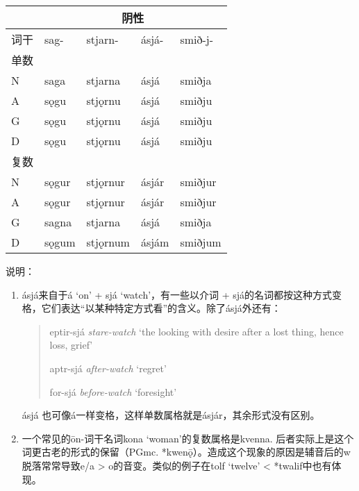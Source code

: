 \begin{longtable}{lllll}
  \toprule
       & \multicolumn{4}{c}{\textbf{阴性}}                              \\
  \midrule
  \endhead
  \bottomrule
  \endfoot
  词干 & sag-                     & stjarn-  & ásjá- & smið-j- \\
  单数 &                          &          &       &         \\
  N    & saga                     & stjarna  & ásjá  & smiðja  \\
  A    & sǫgu                     & stjǫrnu  & ásjá  & smiðju  \\
  G    & sǫgu                     & stjǫrnu  & ásjá  & smiðju  \\
  D    & sǫgu                     & stjǫrnu  & ásjá  & smiðju  \\
  复数 &                          &          &       &         \\
  N    & sǫgur                    & stjǫrnur & ásjár & smiðjur \\
  A    & sǫgur                    & stjǫrnur & ásjár & smiðjur \\
  G    & sagna                    & stjarna  & ásjá  & smiðja  \\
  D    & sǫgum                    & stjǫrnum & ásjám & smiðjum \\
\end{longtable}

说明：

\begin{enumerate}[1)]
  \item
        ásjá来自于á `on' + sjá `watch'，有一些以介词 +
        sjá的名词都按这种方式变格，它们表达``以某种特定方式看''的含义。除了ásjá外还有：
\begin{quote}
    eptir-sjá \emph{stare-watch} `the looking with desire after a lost
    thing, hence loss, grief'
  
    aptr-sjá \emph{after-watch} `regret'
  
    for-sjá \emph{before-watch} `foresight'
  
  \end{quote}
  ásjá 也可像á一样变格，这样单数属格就是ásjár，其余形式没有区别。
\item
          一个常见的ōn-词干名词kona `woman'的复数属格是kvenna.
          后者实际上是这个词更古老的形式的保留（PGmc.
          *kwenǭ）。造成这个现象的原因是辅音后的w脱落常常导致e/a \textgreater{}
          o的音变。类似的例子在tolf `twelve' \textless{} *twalif中也有体现。
  \end{enumerate}
  

